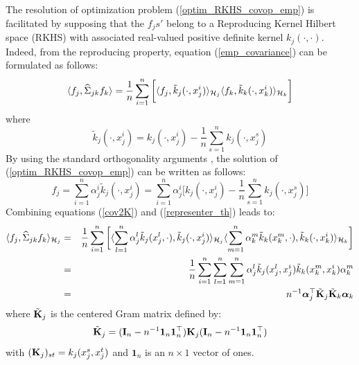 \documentclass[
]{jss}
\begin{document}
The resolution of optimization problem (\ref{optim_RKHS_covop_emp}) is
facilitated by supposing that the \(f_js'\) belong to a Reproducing
Kernel Hilbert space (RKHS) with associated real-valued positive
definite kernel \(k_j(\cdot, \cdot)\). Indeed, from the reproducing
property, equation (\ref{emp_covariance}) can be formulated as follows:
\begin{equation} \langle f_j, \widehat{\Sigma}_{jk}f_k \rangle =
\frac{1}{n}\sum_{i=1}^n\bigg[\langle f_j, \tilde{k}_j(\cdot,
x_j^i)\rangle_{\mathcal{H}_j} \langle f_k, \tilde{k}_k(\cdot,
x_k^i)\rangle_{\mathcal{H}_k}\bigg]
\label{cov2K}
\end{equation} where
\begin{equation} \tilde{k}_j(\cdot, x_j^i) = k_j(\cdot, x_j^i)-
\frac{1}{n}\sum_{s=1}^n k_j(\cdot, x_j^s)
\end{equation} By using the standard orthogonality arguments
\citep{Wahba1990, Bach2002}, the solution of
(\ref{optim_RKHS_covop_emp}) can be written as follows:
\begin{equation} f_j = \sum_{i=1}^n \alpha_j^i \tilde{k}_j(\cdot,
x_j^i) = \sum_{i=1}^n \alpha_j^i \bigg[ k_j(\cdot, x_j^i) -
\frac{1}{n}\sum_{s=1}^n k_j(\cdot, x_j^s)\bigg]
\label{representer_th}
\end{equation} Combining equations (\ref{cov2K}) and
(\ref{representer_th}) leads to:
\begin{eqnarray} \nonumber \langle f_j, \widehat{\Sigma}_{jk}f_k
\rangle_{\mathcal{H}_j} &=& \frac{1}{n}\sum_{i=1}^n\bigg[\langle \sum_{l=1}^n
\alpha_j^l \tilde{k}_j(x_j^l, \cdot), \tilde{k}_j(\cdot,
x_j^i)\rangle_{\mathcal{H}_j} \langle \sum_{m=1}^n \alpha_k^m
\tilde{k}_k(x_k^m, \cdot), \tilde{k}_k(\cdot,
x_k^i)\rangle_{\mathcal{H}_k}\bigg]\\ \nonumber &=&
\frac{1}{n}\sum_{i=1}^n\sum_{l=1}^n \sum_{m=1}^n \alpha_j^l
\tilde{k}_j(x_j^l, x_j^i) \tilde{k}_k(x_k^m, x_k^i)\alpha_k^m \\ &=&
n^{-1}\boldsymbol{\alpha}_j^\top\tilde{\mathbf{K}}_j\tilde{\mathbf{K}}_k \boldsymbol{\alpha}_k
\label{cov2K1}
\end{eqnarray} where \(\tilde{\mathbf{K}}_j\) is the centered Gram matrix
\citep{Scholkopf1998} defined by:
\begin{equation} \tilde{\mathbf{K}}_j = (\mathbf{I}_n -
n^{-1}\mathbf{1}_n
\mathbf{1}_n^\top)\mathbf{K}_j(\mathbf{I}_n-n^{-1}\mathbf{1}_n\mathbf{1}_n^\top)
\end{equation} with \((\mathbf{K}_j)_{st} = k_j(x_j^s, x_j^t)\) and
\(\mathbf{1}_n\) is an \(n \times 1\) vector of ones.
\end{document}
